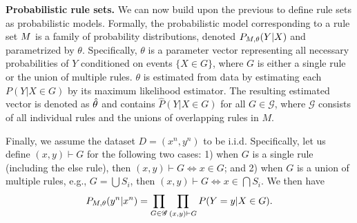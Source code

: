 \medskip \noindent
\textbf{Probabilistic rule sets.}
We can now build upon the previous to define rule sets as probabilistic models. 
Formally, the probabilistic model corresponding to a rule set $M$ is a family of probability distributions, denoted $P_{M, \theta}(Y|X)$ and parametrized by $\theta$. Specifically, $\theta$ is a parameter vector representing all necessary probabilities of $Y$ conditioned on events $\{X \in G\}$, where $G$ is either a single rule or the union of multiple rules. $\theta$ is estimated from data by estimating each $P(Y|X \in G)$ by its maximum likelihood estimator. The resulting estimated vector is denoted as $\hat{\theta}$ and contains $\hat{P}(Y|X \in G)$ for all ${G \in \mathscr{G}}$, where $\mathscr{G}$ consists of all individual rules and the unions of overlapping rules in $M$. 

Finally, we assume the dataset $D = (x^n, y^n)$ to be i.i.d. Specifically, let us define $(x,y) \vdash G$ for the following two cases: 1) when $G$ is a single rule (including the else rule), then $(x, y) \vdash G \iff x \in G$; and 2) when $G$ is a union of multiple rules, e.g., $G = \bigcup S_i$,  then $(x, y) \vdash G \iff x \in \bigcap S_i$. We then have
\begin{equation}
    P_{M, \theta}(y^n|x^n) = \prod_{G \in \mathscr{G}} \prod_{(x,y) \vdash G} P(Y = y | X \in G).
\end{equation}


